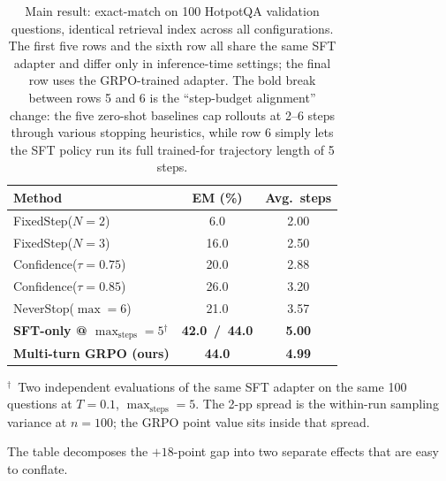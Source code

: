 \documentclass[11pt]{article}
\begin{document}
\begin{table}[h]
\centering
\caption{Main result: exact-match on 100 HotpotQA validation questions,
identical retrieval index across all configurations. The first five rows
and the sixth row all share the same SFT adapter and differ only in
inference-time settings; the final row uses the GRPO-trained adapter.
The bold break between rows 5 and 6 is the ``step-budget alignment''
change: the five zero-shot baselines cap rollouts at 2--6 steps through
various stopping heuristics, while row 6 simply lets the SFT policy run
its full trained-for trajectory length of 5 steps.}
\label{tab:main}
\begin{tabular}{lcc}
\toprule
Method & EM (\%) & Avg.\ steps \\
\midrule
FixedStep($N=2$)        & 6.0  & 2.00 \\
FixedStep($N=3$)        & 16.0 & 2.50 \\
Confidence($\tau=0.75$) & 20.0 & 2.88 \\
Confidence($\tau=0.85$) & 26.0 & 3.20 \\
NeverStop($\max=6$)     & 21.0 & 3.57 \\
\midrule
\textbf{SFT-only @ $\max_{\text{steps}}{=}5$}$^{\dagger}$ & \textbf{42.0 \,/\, 44.0} & \textbf{5.00} \\
\textbf{Multi-turn GRPO (ours)}                           & \textbf{44.0}            & \textbf{4.99} \\
\bottomrule
\end{tabular}

\vspace{0.25em}
{\footnotesize
$^{\dagger}$~Two independent evaluations of the same SFT adapter on the
same 100 questions at $T{=}0.1$, $\max_{\text{steps}}{=}5$. The 2-pp
spread is the within-run sampling variance at $n{=}100$; the GRPO
point value sits inside that spread.}
\end{table}

The table decomposes the $+18$-point gap into two separate effects
that are easy to conflate.
\end{document}
